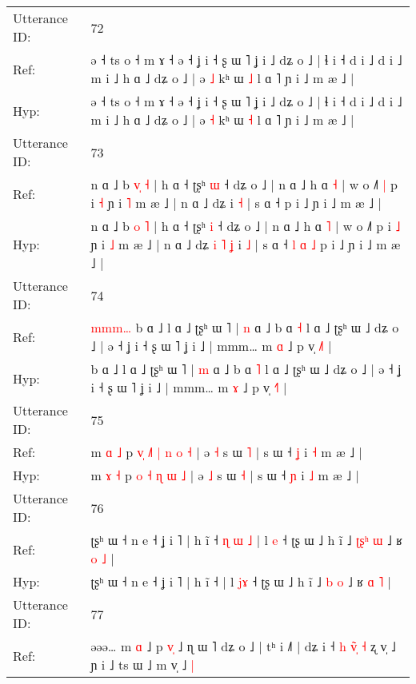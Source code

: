 \documentclass[10pt]{article}
\DeclareRobustCommand{\hl}[1]{{\textcolor{red}{#1}}}
\begin{document}
\begin{longtable}{ll}
 \\
\midrule
Utterance ID: & 72 \\
Ref: & ə ˧ ts o ˧ m ɤ ˧ ə ˧ ʝ i ˧ ʂ ɯ ˥ ʝ i ˩ dʑ o ˩ | ɬ i ˧ d i ˩ d i ˩ m i ˩ h ɑ ˩ dʑ o ˩ | ə \hl{˩} kʰ ɯ \hl{˩} l ɑ ˥ ɲ i ˩ m æ ˩ |
 \\
Hyp: & ə ˧ ts o ˧ m ɤ ˧ ə ˧ ʝ i ˧ ʂ ɯ ˥ ʝ i ˩ dʑ o ˩ | ɬ i ˧ d i ˩ d i ˩ m i ˩ h ɑ ˩ dʑ o ˩ | ə \hl{˧} kʰ ɯ \hl{˧} l ɑ ˥ ɲ i ˩ m æ ˩ |
 \\
\midrule
Utterance ID: & 73 \\
Ref: & n ɑ ˩ b \hl{v}\hl{̩} \hl{˧} | h ɑ ˧ ʈʂʰ \hl{ɯ} ˧ dʑ o ˩ | n ɑ ˩ h ɑ \hl{˧} | w o ˩˥\hl{ }\hl{|} p i \hl{˧} ɲ i \hl{˥} m æ ˩ | n ɑ ˩ dʑ\hl{}\hl{}\hl{}\hl{}\hl{}\hl{} i \hl{˧} | s ɑ ˧\hl{}\hl{}\hl{}\hl{}\hl{}\hl{} p i ˩ ɲ i ˩ m æ ˩ |
 \\
Hyp: & n ɑ ˩ b \hl{}\hl{o} \hl{˥} | h ɑ ˧ ʈʂʰ \hl{i} ˧ dʑ o ˩ | n ɑ ˩ h ɑ \hl{˥} | w o ˩˥\hl{}\hl{} p i \hl{˩} ɲ i \hl{˩} m æ ˩ | n ɑ ˩ dʑ\hl{ }\hl{i}\hl{ }\hl{˥}\hl{ }\hl{ʝ} i \hl{˩} | s ɑ ˧\hl{ }\hl{l}\hl{ }\hl{ɑ}\hl{ }\hl{˩} p i ˩ ɲ i ˩ m æ ˩ |
 \\
\midrule
Utterance ID: & 74 \\
Ref: & \hl{m}\hl{m}\hl{m}\hl{…}\hl{ }b ɑ ˩ l ɑ ˩ ʈʂʰ ɯ ˥ | \hl{n} ɑ ˩ b ɑ \hl{˧} l ɑ ˩ ʈʂʰ ɯ ˩ dʑ o ˩ | ə ˧ ʝ i ˧ ʂ ɯ ˥ ʝ i ˩ | mmm… m \hl{ɑ} ˩ p v̩ \hl{˩}˥ |
 \\
Hyp: & \hl{}\hl{}\hl{}\hl{}\hl{}b ɑ ˩ l ɑ ˩ ʈʂʰ ɯ ˥ | \hl{m} ɑ ˩ b ɑ \hl{˥} l ɑ ˩ ʈʂʰ ɯ ˩ dʑ o ˩ | ə ˧ ʝ i ˧ ʂ ɯ ˥ ʝ i ˩ | mmm… m \hl{ɤ} ˩ p v̩ \hl{˧}˥ |
 \\
\midrule
Utterance ID: & 75 \\
Ref: & m \hl{ɑ} \hl{˩} p\hl{ }\hl{v}\hl{̩} \hl{˩}\hl{˥} \hl{|} \hl{n} \hl{o} \hl{˧} | ə \hl{˧} s ɯ \hl{˥} | s ɯ ˧ \hl{ʝ} i \hl{˧} m æ ˩ |
 \\
Hyp: & m \hl{ɤ} \hl{˧} p\hl{}\hl{}\hl{} \hl{}\hl{o} \hl{˧} \hl{ɳ} \hl{ɯ} \hl{˩} | ə \hl{˩} s ɯ \hl{˧} | s ɯ ˧ \hl{ɲ} i \hl{˩} m æ ˩ |
 \\
\midrule
Utterance ID: & 76 \\
Ref: & ʈʂʰ ɯ ˧ n e ˧ ʝ i ˥ | h ĩ ˧\hl{ }\hl{ɳ}\hl{ }\hl{ɯ}\hl{ }\hl{˩} | l \hl{}\hl{e} ˧ ʈʂ ɯ ˩ h ĩ ˩ \hl{ʈ}\hl{ʂ}\hl{ʰ} \hl{ɯ} ˩ ʁ \hl{o} \hl{˩} |
 \\
Hyp: & ʈʂʰ ɯ ˧ n e ˧ ʝ i ˥ | h ĩ ˧\hl{}\hl{}\hl{}\hl{}\hl{}\hl{} | l \hl{j}\hl{ɤ} ˧ ʈʂ ɯ ˩ h ĩ ˩ \hl{}\hl{}\hl{b} \hl{o} ˩ ʁ \hl{ɑ} \hl{˥} |
 \\
\midrule
Utterance ID: & 77 \\
Ref: & əəə… m \hl{ɑ} ˩ p \hl{v}\hl{̩} ˩ ɳ ɯ ˥ dʑ o ˩ | tʰ i ˩˥ | dʑ i ˧\hl{ }\hl{h} \hl{v}\hl{̃}\hl{̩} \hl{˧} ʐ v̩ ˩ ɲ i ˩ ts ɯ ˩\hl{}\hl{} m v̩ ˩\hl{ }\hl{|}

\end{longtable}
\end{document}

